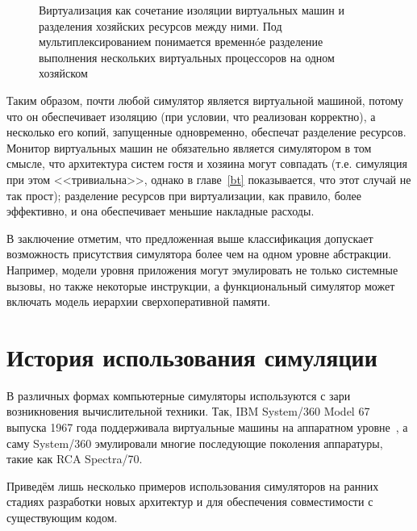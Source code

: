 \begin{figure}[htb]
    \centering
    \caption[Виртуализация как сочетание изоляции и разделения ресурсов]{Виртуализация как сочетание изоляции виртуальных машин и разделения хозяйских ресурсов между ними. Под мультиплексированием понимается временн\'{o}е разделение выполнения нескольких виртуальных процессоров на одном хозяйском}
    \label{fig:multiplexing}
\end{figure}

Таким образом, почти любой симулятор является виртуальной машиной, потому что он обеспечивает изоляцию (при условии, что реализован корректно), а несколько его копий, запущенные одновременно, обеспечат разделение ресурсов. Монитор виртуальных машин не обязательно является симулятором в том смысле, что архитектура систем гостя и хозяина могут совпадать (т.е. симуляция при этом <<тривиальна>>, однако в главе~\ref{bt} показывается, что этот случай не так прост); разделение ресурсов при виртуализации, как правило, более эффективно, и она обеспечивает меньшие накладные расходы.

В заключение отметим, что предложенная выше классификация допускает возможность присутствия симулятора более чем на одном уровне абстракции. Например, модели уровня приложения могут эмулировать не только системные вызовы, но также некоторые инструкции, а функциональный симулятор может включать модель иерархии сверхоперативной памяти.

\section{История использования симуляции}

В различных формах компьютерные симуляторы используются с зари возникновения вычислительной техники. Так, IBM System/360 Model 67 выпуска 1967 года поддерживала виртуальные машины на аппаратном уровне~\cite{ibm360vm}, а саму System/360 эмулировали многие последующие поколения аппаратуры, такие как RCA Spectra/70.

Приведём лишь несколько примеров использования симуляторов на ранних стадиях разработки новых архитектур и для обеспечения совместимости с существующим кодом.

